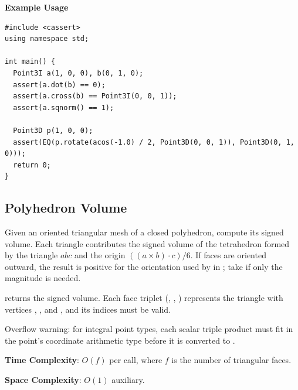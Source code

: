 \textbf{Example Usage}\par
\begin{lstlisting}[style=cpp]
#include <cassert>
using namespace std;

int main() {
  Point3I a(1, 0, 0), b(0, 1, 0);
  assert(a.dot(b) == 0);
  assert(a.cross(b) == Point3I(0, 0, 1));
  assert(a.sqnorm() == 1);

  Point3D p(1, 0, 0);
  assert(EQ(p.rotate(acos(-1.0) / 2, Point3D(0, 0, 1)), Point3D(0, 1, 0)));
  return 0;
}
\end{lstlisting}
\subsection{Polyhedron Volume}
\label{sec:7.5.2}
Given an oriented triangular mesh of a closed polyhedron, compute its signed volume. Each triangle contributes the signed volume of the tetrahedron formed by the triangle $abc$ and the origin $((a \times b) \cdot c) / 6$. If faces are oriented outward, the result is positive for the orientation used by  in ; take  if only the magnitude is needed.

\begin{compactitem}
  \item {} returns the signed volume. Each face triplet (, , ) represents the triangle with vertices , , and , and its indices must be valid.
\end{compactitem}

Overflow warning: for integral point types, each scalar triple product must fit in the point's coordinate arithmetic type before it is converted to .

\textbf{Time Complexity}: $O(f)$ per call, where $f$ is the number of triangular faces.

\textbf{Space Complexity}: $O(1)$ auxiliary.

